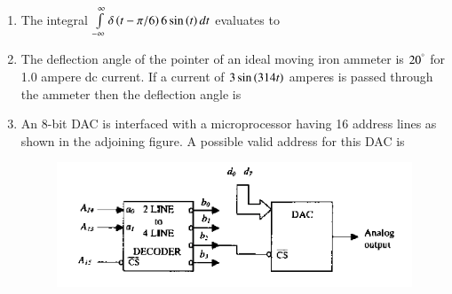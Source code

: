 \documentclass[journal,12pt,onecolumn]{IEEEtran}
\theoremstyle{remark}
\begin{document}
\begin{enumerate}
\hfill{}\begin{enumerate}  \end{enumerate}



\item The integral $\int\limits_{-\infty}^{\infty} \delta\left(t - \pi/6\right) 6 \sin\left(t\right) dt$ evaluates to

\hfill{}\begin{enumerate}  \end{enumerate}



\item The deflection angle of the pointer of an ideal moving iron ammeter is $20^\degree$ for 1.0 ampere dc current. If a current of $3 \sin\left(314t\right)$ amperes is passed through the ammeter then the deflection angle is

\hfill{}\begin{enumerate}  \end{enumerate}



\item An 8-bit DAC is interfaced with a microprocessor having 16 address lines  as shown in the adjoining figure. A possible valid address for this DAC is
\begin{figure}[H]
    \centering
    \includegraphics[width = 0.7\columnwidth]{q23}
    \caption*{}
    \label{Q23}
\end{figure}


\end{enumerate}
\end{document}
